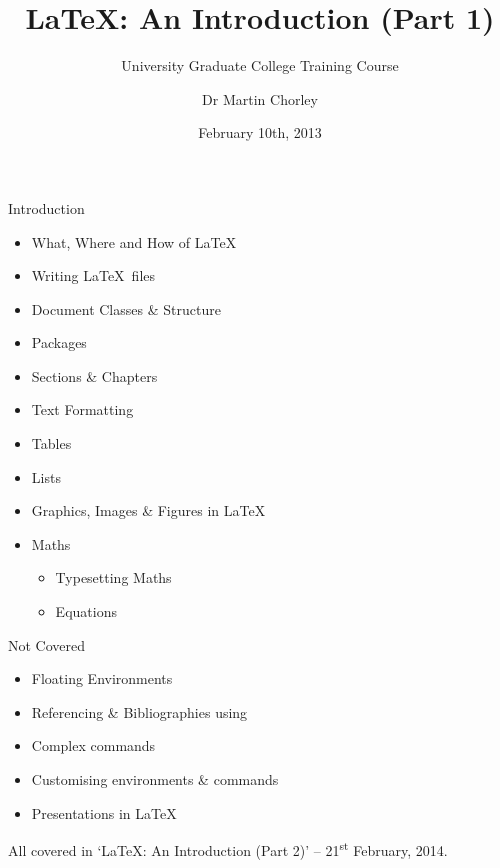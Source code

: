 \documentclass[mathserif]{beamer}
\title{\LaTeX: An Introduction (Part 1)}
\subtitle{University Graduate College Training Course}
\author[Martin Chorley]{Dr Martin Chorley}
\institute[COMSC]{School of Computer Science \& Informatics, Cardiff University}
\date[10/02/13]{February 10th, 2013}
\begin{document}
\begin{frame}[plain]
	\titlepage
\end{frame}
	

\begin{frame}{Introduction}

\vfill
\begin{itemize}
	\item What, Where and How of \LaTeX
	\item Writing \LaTeX\ files
	\item Document Classes \& Structure
	\item Packages
	\item Sections \& Chapters
	\item Text Formatting
	\item Tables
	\item Lists
	\item Graphics, Images \& Figures in \LaTeX
	\item Maths
		\begin{itemize}
			\item Typesetting Maths
			\item Equations
		\end{itemize}	
\end{itemize}
\vfill
\end{frame}

\begin{frame}{Not Covered}

\vfill
\begin{itemize}
	\item Floating Environments
	\item Referencing \& Bibliographies using \BibTeX
	\item Complex commands
	\item Customising environments \& commands
	\item Presentations in \LaTeX
\end{itemize}
\vfill
	All covered in `\LaTeX: An Introduction (Part 2)' -- 21\textsuperscript{st} February, 2014.
\vfill
\end{frame}
\end{document}
